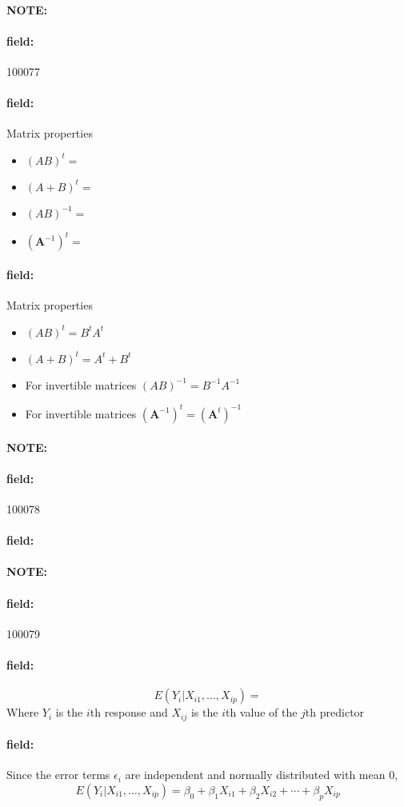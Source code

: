 \documentclass[12pt]{article}
\newenvironment{note}{\paragraph{NOTE:}}{}
\newenvironment{field}{\paragraph{field:}}{}
\begin{document}

\begin{note} \begin{field} \tiny 100077 \end{field}
  \begin{field}
    Matrix properties
    \begin{itemize}
      \item $(AB)^{t} = $
      \item $(A+B)^t = $
      \item $(AB)^{-1} = $
      \item $(\mathbf{A}^{-1})^t = $
    \end{itemize}
  \end{field}
  \begin{field}
    Matrix properties
    \begin{itemize}
      \item $(AB)^{t} = B^tA^t$
      \item $(A+B)^t = A^t + B^t$
      \item For invertible matrices $(AB)^{-1} = B^{-1}A^{-1}$
      \item For invertible matrices $(\mathbf{A}^{-1})^t = (\mathbf{A}^t)^{-1}$
    \end{itemize}
  \end{field}
\end{note}

\begin{note} \begin{field} \tiny 100078 \end{field}
  \begin{field}

  \end{field}
\end{note}


\begin{note} \begin{field} \tiny 100079 \end{field}
  \begin{field}
    $$ E(Y_i | X_{i1}, \ldots , X_{ip}) = $$
    Where $Y_i$ is the $i$th response and $X_{ij}$ is the $i$th value of the $j$th predictor
  \end{field}
  \begin{field}
    Since the error terms $\epsilon_i$ are independent and normally distributed with mean 0,
    $$ E(Y_i | X_{i1}, \ldots , X_{ip}) = \beta_0 + \beta_1 X_{i1} + \beta_2 X_{i2} + \cdots + \beta_pX_{ip}$$
  \end{field}
\end{note}
\end{document}
